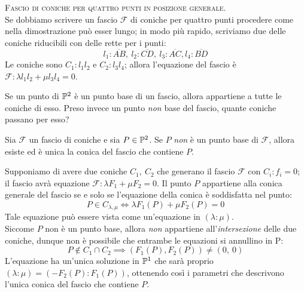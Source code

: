 \begin{tips} \textsc{Fascio di coniche per quattro punti in posizione generale}. \label{fascio coniche per 4 pt pos gen} \\
	Se dobbiamo scrivere un fascio $\mathcal{F}$ di coniche per quattro punti procedere come nella dimostrazione può esser lungo; in modo più rapido, scriviamo due delle coniche riducibili con delle rette per i punti:
	\begin{equation*}
		l_1\colon\overline{AB},\ l_2\colon \overline{CD},\ l_3\colon\overline{AC}, l_4\colon \overline{BD} 
	\end{equation*} 
	Le coniche sono $C_1\colon l_1l_2$ e $C_2\colon l_3l_4$; allora l'equazione del fascio è $\mathcal{F}\colon \lambda l_1 l_2 + \mu l_3 l_4 =0$.
\end{tips}
Se un punto di $\proj[2]{\ }$ è un punto base di un fascio, allora appartiene a tutte le coniche di esso. Preso invece un punto \textit{non} base del fascio, quante coniche passano per esso?
\begin{proposition}
	Sia $\mathcal{F}$ un fascio di coniche e sia $P\in \proj[2]{\ }$. Se $P$ \textit{non} è un punto base di $\mathcal{F}$, allora esiste ed è unica la conica del fascio che contiene $P$.
\end{proposition}
\begin{demonstration}
	Supponiamo di avere due coniche $C_1,\ C_2$ che generano il fascio $\mathcal{F}$ con $C_i\colon f_i=0$; il fascio avrà equazione $\mathcal{F}\colon \lambda F_1 +\mu F_2=0$. Il punto $P$ appartiene alla conica generale del fascio se e solo se l'equazione della conica è soddisfatta nel punto:
		\begin{equation*}
			P\in C_{\lambda,\mu} \iff \lambda F_1\left(P\right) +\mu F_2\left(P\right)=0
		\end{equation*}
	Tale equazione può essere vista come un'equazione in $(\lambda \colon \mu)$.\\
	Siccome $P$ non è un punto base, allora \textit{non} appartiene all'\textit{intersezione} delle due coniche, dunque non è possibile che entrambe le equazioni si annullino in P: 
	\begin{equation*}
		P\notin C_1\cap C_2 \implies (F_1\left(P\right), F_2\left(P\right)) \neq \left(0,\ 0\right)
	\end{equation*}
	L'equazione ha un'unica soluzione in $\proj[1]{\ }$ che sarà proprio $(\lambda \colon \mu)=(-F_2\left(P\right)\colon F_1\left(P\right))$, ottenendo così i parametri che descrivono l'unica conica del fascio che contiene $P$.
\end{demonstration}
